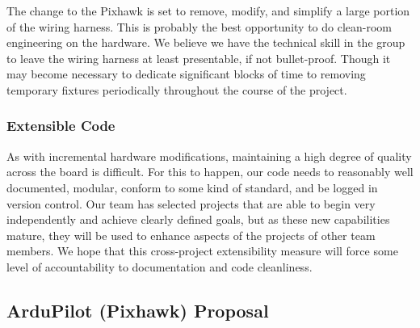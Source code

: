 \documentclass[a4paper, 11pt, titlepage]{article}
\begin{document}
      The change to the Pixhawk is set to remove, modify, and simplify a large portion of the wiring harness.  This is probably the best opportunity to do clean-room engineering on the hardware.  We believe we have the technical skill in the group to leave the wiring harness at least presentable, if not bullet-proof.
      Though it may become necessary to dedicate significant blocks of time to removing temporary fixtures periodically throughout the course of the project.

    \subsubsection{Extensible Code}
      As with incremental hardware modifications, maintaining a high degree of quality across the board is difficult.  
      For this to happen, our code needs to reasonably well documented, modular, conform to some kind of standard, and be logged in version control. 
      Our team has selected projects that are able to begin very independently and achieve clearly defined goals, but as these new capabilities mature, they will be used to enhance aspects of the projects of other team members.  We hope that this cross-project extensibility measure will force some level of accountability to documentation and code cleanliness.



\renewcommand{\refname}{References}


%


\begin{appendices}
  \section{ArduPilot (Pixhawk) Proposal} \label{sec:PihawkProposal}
    

\end{appendices}

	
\end{document}
